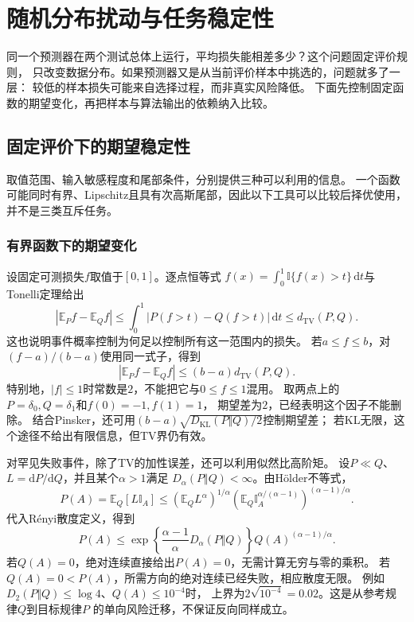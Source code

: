 \section{随机分布扰动与任务稳定性}
\label{sec:information-task-stability}

同一个预测器在两个测试总体上运行，平均损失能相差多少？这个问题固定评价规则，
只改变数据分布。如果预测器又是从当前评价样本中挑选的，问题就多了一层：
较低的样本损失可能来自选择过程，而非真实风险降低。
下面先控制固定函数的期望变化，再把样本与算法输出的依赖纳入比较。

\subsection{固定评价下的期望稳定性}
\label{sec:information-fixed-evaluation}

取值范围、输入敏感程度和尾部条件，分别提供三种可以利用的信息。
一个函数可能同时有界、Lipschitz且具有次高斯尾部，因此以下工具可以比较后择优使用，
并不是三类互斥任务。

\subsubsection{有界函数下的期望变化}
\label{sec:information-bounded-evaluation}

设固定可测损失\(f\)取值于\([0,1]\)。逐点恒等式
\(f(x)=\int_0^1\mathbb I\{f(x)>t\}\,\mathrm dt\)与Tonelli定理给出
\[
  |\mathbb E_Pf-\mathbb E_Qf|
  \leq\int_0^1|P(f>t)-Q(f>t)|\,\mathrm dt
  \leq d_{\mathrm{TV}}(P,Q).
\]
这也说明事件概率控制为何足以控制所有这一范围内的损失。
若\(a\leq f\leq b\)，对\((f-a)/(b-a)\)使用同一式子，得到
\[
  |\mathbb E_Pf-\mathbb E_Qf|
  \leq(b-a)d_{\mathrm{TV}}(P,Q).
\]
特别地，\(|f|\leq1\)时常数是\(2\)，不能把它与\(0\leq f\leq1\)混用。
取两点上的\(P=\delta_0,Q=\delta_1\)和\(f(0)=-1,f(1)=1\)，
期望差为\(2\)，已经表明这个因子不能删除。
结合Pinsker，还可用\((b-a)\sqrt{D_{\mathrm{KL}}(P\Vert Q)/2}\)控制期望差；
若KL无限，这个途径不给出有限信息，但TV界仍有效。

对罕见失败事件，除了TV的加性误差，还可以利用似然比高阶矩。
设\(P\ll Q\)、\(L=\mathrm dP/\mathrm dQ\)，并且某个\(\alpha>1\)满足
\(D_\alpha(P\Vert Q)<\infty\)。由H\"older不等式，
\[
  P(A)=\mathbb E_Q[L\mathbb I_A]
  \leq(\mathbb E_QL^\alpha)^{1/\alpha}
       (\mathbb E_Q\mathbb I_A^{\alpha/(\alpha-1)})^{(\alpha-1)/\alpha}.
\]
代入R\'enyi散度定义，得到
\begin{equation}
  P(A)\leq
  \exp\!\left\{\frac{\alpha-1}{\alpha}D_\alpha(P\Vert Q)\right\}
  Q(A)^{(\alpha-1)/\alpha}.
  \label{eq:information-renyi-event-bound}
\end{equation}
若\(Q(A)=0\)，绝对连续直接给出\(P(A)=0\)，无需计算无穷与零的乘积。
若\(Q(A)=0<P(A)\)，所需方向的绝对连续已经失败，相应散度无限。
例如\(D_2(P\Vert Q)\leq\log4\)、\(Q(A)\leq10^{-4}\)时，
上界为\(2\sqrt{10^{-4}}=0.02\)。这是从参考规律\(Q\)到目标规律\(P\)
的单向风险迁移，不保证反向同样成立。

